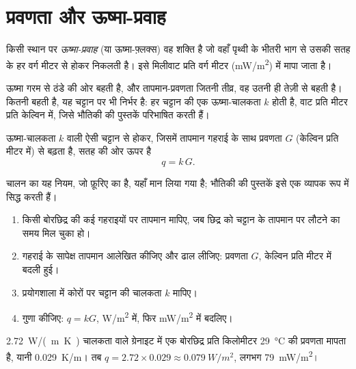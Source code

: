 \section{प्रवणता और ऊष्मा-प्रवाह}

\begin{definition}[ऊष्मा-प्रवाह]\label{def:g12:internal-heat:heat-flow}
किसी स्थान पर \emph{ऊष्मा-प्रवाह} (या ऊष्मा-फ़्लक्स) वह
शक्ति है जो वहाँ पृथ्वी के भीतरी भाग से उसकी सतह के हर वर्ग मीटर से होकर
निकलती है। इसे मिलीवाट प्रति वर्ग मीटर
(\unit{mW/m^2}) में मापा जाता है।
\end{definition}

ऊष्मा गरम से ठंडे की ओर बहती है, और तापमान-प्रवणता जितनी तीव्र, वह उतनी ही
तेज़ी से बहती है। कितनी बहती है, यह चट्टान पर भी निर्भर है: हर चट्टान की एक
ऊष्मा-चालकता $k$ होती है, वाट प्रति मीटर प्रति केल्विन में, जिसे भौतिकी की
पुस्तकें परिभाषित करती हैं।

\begin{proposition}[ऊष्मा-प्रवाह और प्रवणता]\label{prop:g12:internal-heat:fourier}
ऊष्मा-चालकता $k$ वाली ऐसी चट्टान से होकर, जिसमें तापमान गहराई के साथ
प्रवणता $G$ (केल्विन प्रति मीटर में) से बढ़ता है, सतह की ओर ऊपर
 है
\[
  q = k\,G .
\]
\end{proposition}

चालन का यह नियम, जो फ़ूरिए का है, यहाँ मान लिया गया है; भौतिकी की पुस्तकें
इसे एक व्यापक रूप में सिद्ध करती हैं।

\begin{method}[बोरछिद्र से ऊष्मा-प्रवाह]\label{met:g12:internal-heat:borehole}
\begin{enumerate}
  \item किसी बोरछिद्र की कई गहराइयों पर तापमान मापिए, जब
        छिद्र को चट्टान के तापमान पर लौटने का समय मिल चुका हो।
  \item गहराई के सापेक्ष तापमान आलेखित कीजिए और ढाल लीजिए: प्रवणता $G$,
        केल्विन प्रति मीटर में बदली हुई।
  \item प्रयोगशाला में कोरों पर चट्टान की चालकता $k$
        मापिए।
  \item गुणा कीजिए: $q = kG$, \unit{W/m^2} में, फिर \unit{mW/m^2} में बदलिए।
\end{enumerate}
\end{method}

\begin{example}[ग्रेनाइट में एक बोरछिद्र]\label{ex:g12:internal-heat:borehole}
\qty{2.72}{W/(m.K)} चालकता वाले ग्रेनाइट में एक बोरछिद्र
प्रति किलोमीटर \qty{29}{\celsius} की प्रवणता मापता है, यानी \qty{0.029}{K/m}।
तब $q = 2.72 \times 0.029 \approx \qty{0.079}{W/m^2}$, लगभग
\qty{79}{mW/m^2}।
\end{example}

